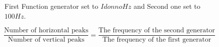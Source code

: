 \documentclass[11pt]{article}
\begin{document}
\begin{question}
{\begin{figure}[H]
\begin{center}
                \caption{First Function generator set to $I donno Hz$ and Second one set to $100Hz$.}
            \end{center}
        \end{figure}

        \[
            \frac{\text{Number of horizontal peaks}}{\text{Number of vertical peaks}} = \frac{\text{The frequency of the second generator}}
            {\text{The frequency of the first generator}}
        \]
    }

\end{question}

\end{document}
